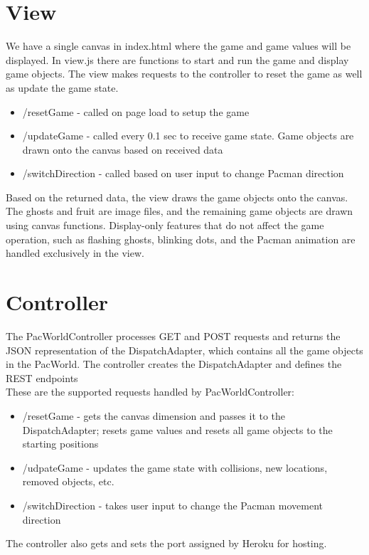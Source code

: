 \documentclass[letterpaper, 11pt]{article}
\begin{document}
\section{View}
We have a single canvas in index.html where the game and game values will be displayed. In view.js there are functions to start and run the game and display game objects. The view makes requests to the controller to reset the game as well as update the game state. 

\begin{itemize}
  \item /resetGame - called on page load to setup the game
  \item /updateGame - called every 0.1 sec to receive game state. Game objects are drawn onto the canvas based on received data
  \item /switchDirection - called based on user input to change Pacman direction
\end{itemize}

Based on the returned data, the view draws the game objects onto the canvas. The ghosts and fruit are image files, and the remaining game objects are drawn using canvas functions. Display-only features that do not affect the game operation, such as flashing ghosts, blinking dots, and the Pacman animation are handled exclusively in the view.

\section{Controller}
The PacWorldController processes GET and POST requests and returns the JSON representation of the DispatchAdapter, which contains all the game objects in the PacWorld. The controller creates the DispatchAdapter and defines the REST endpoints \\ 

These are the supported requests handled by PacWorldController:
\begin{itemize}
  \item /resetGame - gets the canvas dimension and passes it to the DispatchAdapter; resets game values and resets all game objects to the starting positions
  \item /udpateGame - updates the game state with collisions, new locations, removed objects, etc.
  \item /switchDirection - takes user input to change the Pacman movement direction
\end{itemize}

The controller also gets and sets the port assigned by Heroku for hosting.
\end{document}
